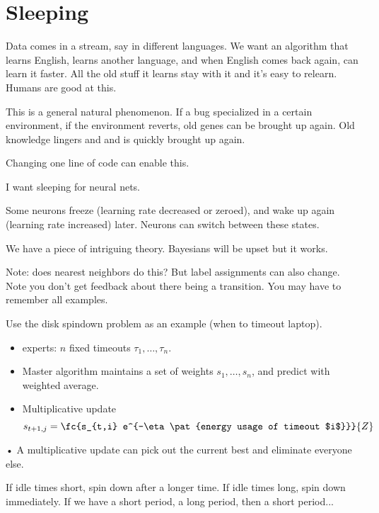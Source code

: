 \section{Sleeping}

Data comes in a stream, say in different languages. 
We want an algorithm that learns English, learns another language, and when English comes back again, can learn it faster. All the old stuff it learns stay with it and it's easy to relearn. Humans are good at this. 

This is a general natural phenomenon. If a bug specialized in a certain environment, if the environment reverts, old genes can be brought up again. Old knowledge lingers and and is quickly brought up again.

Changing one line of code can enable this.


I want sleeping for neural nets.

Some neurons freeze (learning rate decreased or zeroed), and wake up again (learning rate increased) later. Neurons can switch between these states.

We have a piece of intriguing theory. Bayesians will be upset but it works.

Note: does nearest neighbors do this? But label assignments can also change. Note you don't get feedback about there being a transition. You may have to remember all examples.


Use the disk spindown problem as an example (when to timeout laptop).
\begin{itemize}
\item
experts: $n$ fixed timeouts $\tau_1,\ldots, \tau_n$.
\item
Master algorithm maintains a set of weights $s_1,\ldots, s_n$, and predict with weighted average.
\item
Multiplicative update
$$
s_{t+1,j} = \fc{s_{t,i} e^{-\eta \pat{energy usage of timeout $i$}}}{Z}
$$
\end{itemize}•
A multiplicative update can pick out the current best and eliminate everyone else.

If idle times short, spin down after a longer time.
If idle times long, spin down immediately.
If we have a short period, a long period, then a short period...

